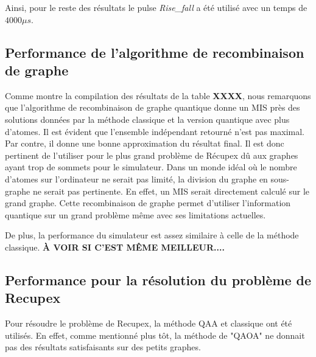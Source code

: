 \documentclass[11pt]{article}
\begin{document}
Ainsi, pour le reste des résultats le pulse \textit{Rise\_fall} a été utilisé avec un temps de $4000 \mu s$.

\subsection{Performance de l'algorithme de recombinaison de graphe}
Comme montre la compilation des résultats de la table \textbf{XXXX}, nous remarquons que l'algorithme de recombinaison de graphe quantique donne un MIS près des solutions données par la méthode classique et la version quantique avec plus d'atomes. Il est évident que l'ensemble indépendant retourné n'est pas maximal. Par contre, il donne une bonne approximation du résultat final. Il est donc pertinent de l'utiliser pour le plus grand problème de Récupex dû aux graphes ayant trop de sommets pour le simulateur. Dans un monde idéal où le nombre d'atomes sur l'ordinateur ne serait pas limité, la division du graphe en sous-graphe ne serait pas pertinente. En effet, un MIS serait directement calculé sur le grand graphe. Cette recombinaison de graphe permet d'utiliser l'information quantique sur un grand problème même avec ses limitations actuelles. 

De plus, la performance du simulateur est assez similaire à celle de la méthode classique. \textbf{À VOIR SI C'EST MÊME MEILLEUR....}


\subsection{Performance pour la résolution du problème de Recupex}
Pour résoudre le problème de Recupex, la méthode QAA et classique ont été utilisés. En effet, comme mentionné plus tôt, la méthode de "QAOA" ne donnait pas des résultats satisfaisants sur des petits graphes. 
\end{document}
